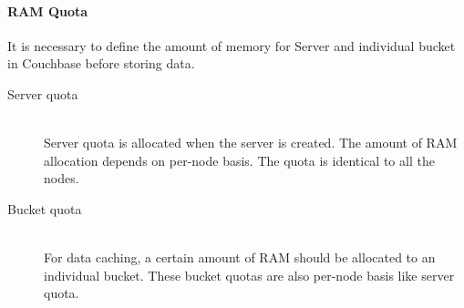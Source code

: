\paragraph{RAM Quota}
It is necessary to define the amount of memory for Server and individual bucket in Couchbase before storing data. 
\begin{description}
\item[Server quota] \hfill \\
          Server quota is allocated when the server is created. The amount of RAM allocation depends on per-node basis. The quota is identical to all the nodes.

\item[Bucket quota] \hfill \\   
For data caching, a certain amount of RAM should be allocated to an individual bucket. These bucket quotas are also per-node basis like server quota. 

\end{description}
           
